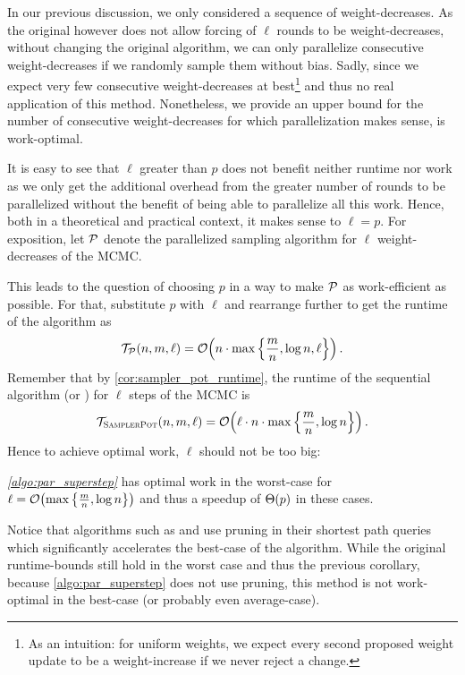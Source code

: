 In our previous discussion, we only considered a sequence of weight-decreases.
As the original \markov however does not allow forcing of $\ell$ rounds to be weight-decreases, without changing the original algorithm, we can only parallelize consecutive weight-decreases if we randomly sample them without bias.
Sadly, since we expect very few consecutive weight-decreases at best\footnote{
    As an intuition: for uniform weights, we expect every second proposed weight update to be a weight-increase if we never reject a change.
} and thus no real application of this method.
Nonetheless, we provide an upper bound for the number of consecutive weight-decreases for which parallelization makes sense, \ie is work-optimal.

It is easy to see that  $\ell$ greater than $p$ does not benefit neither runtime nor work as we only get the additional overhead from the greater number of rounds to be parallelized without the benefit of being able to parallelize all this work.
Hence, both in a theoretical and practical context, it makes sense to  $\ell = p$.
For exposition, let $\mathcal{P}$ denote the parallelized sampling algorithm for $\ell$ weight-decreases of the MCMC.

This leads to the question of choosing $p$ in a way to make $\mathcal{P}$ as work-efficient as possible.
For that, substitute $p$ with $\ell$ and rearrange further to get the runtime of the algorithm as \[
    \mathcal{T}_{\mathcal{P}}(n, m, \ell) = \mathcal O\!\left(n \cdot \max\left\{\frac{m}{n}, \log n, \ell\right\}\right).
\]
Remember that by \cref{cor:sampler_pot_runtime}, the runtime of the sequential algorithm \algsp (or \algbp) for $\ell$ steps of the MCMC is \[ 
    \mathcal{T}_{\textsc{SamplerPot}}(n, m, \ell) = \mathcal O\!\left(\ell \cdot n \cdot \max\left\{\frac{m}{n}, \log n\right\}\right).
\]  
Hence to achieve optimal work, $\ell$ should not be too big:

\begin{corollary}
    \emph{\cref{algo:par_superstep}} has optimal work in the worst-case for $\ell = \mathcal O\!\left(\max\left\{\frac{m}{n}, \log n\right\}\right)$ and thus a speedup of $\Theta\!\left(p\right)$ in these cases.
\end{corollary}

Notice that algorithms such as \algsp and \algbp use pruning in their shortest path queries which significantly accelerates the best-case of the algorithm.
While the original runtime-bounds still hold in the worst case and thus the previous corollary, because \cref{algo:par_superstep} does not use pruning, this method is not work-optimal in the best-case (or probably even average-case).

